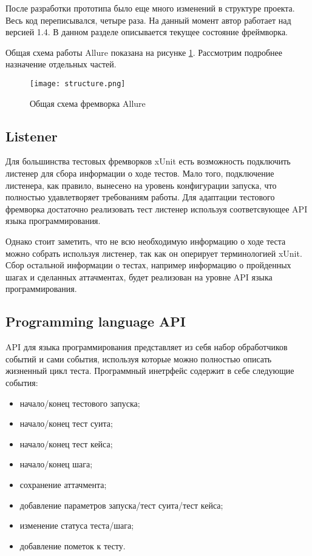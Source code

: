 После разработки прототипа было еще много изменений в структуре проекта. Весь код переписывался, четыре раза. На данный момент автор работает над версией 1.4. В данном разделе описывается текущее состояние фреймворка.

Общая схема работы Allure показана на рисунке \ref{fig:allure}. Рассмотрим подробнее назначение отдельных частей.

\begin{figure}[htb]
\centering
\texttt{[image: structure.png]}
\caption{Общая схема фремворка Allure}
\label{fig:allure}
\end{figure}

\subsection{Listener}

Для большинства тестовых фремворков xUnit есть возможность подключить листенер для сбора информации о ходе тестов. Мало того, подключение листенера, как правило, вынесено на уровень конфигурации запуска, что полностью удавлетворяет требованиям работы. Для адаптации тестового фремворка достаточно реализовать тест листенер используя соответсвующее API языка программирования.

Однако стоит заметить, что не всю необходимую информацию о ходе теста можно собрать используя листенер, так как он оперирует терминологией xUnit. Сбор остальной информации о тестах, например информацию о пройденных шагах и сделанных аттачментах, будет реализован на уровне API языка программирования.

\subsection{Programming language API}

API для языка программирования представляет из себя набор обработчиков событий и сами события, используя которые можно полностью описать жизненный цикл теста. Программный инетрфейс содержит в себе следующие события:

\begin{itemize}
\item начало/конец тестового запуска;
\item начало/конец тест суита;
\item начало/конец тест кейса;
\item начало/конец шага;
\item сохранение аттачмента;
\item добавление параметров запуска/тест суита/тест кейса;
\item изменение статуса теста/шага;
\item добавление пометок к тесту.
\end{itemize}

